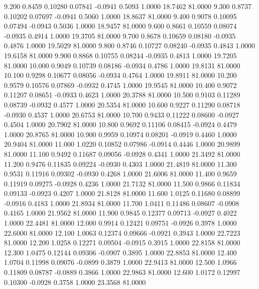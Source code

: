    9.200   0.8459   0.10280   0.07841  -0.0941   0.5093   1.0000  18.7462  81.0000
   9.300   0.8737   0.10202   0.07697  -0.0941   0.5060   1.0000  18.8637  81.0000
   9.400   0.9078   0.10095   0.07494  -0.0943   0.5036   1.0000  18.9457  81.0000
   9.600   0.8661   0.10559   0.08074  -0.0935   0.4914   1.0000  19.3705  81.0000
   9.700   0.8678   0.10659   0.08180  -0.0935   0.4876   1.0000  19.5029  81.0000
   9.800   0.8746   0.10727   0.08240  -0.0935   0.4843   1.0000  19.6158  81.0000
   9.900   0.8868   0.10755   0.08244  -0.0935   0.4813   1.0000  19.7205  81.0000
  10.000   0.9049   0.10739   0.08186  -0.0934   0.4786   1.0000  19.8131  81.0000
  10.100   0.9298   0.10677   0.08056  -0.0934   0.4764   1.0000  19.8911  81.0000
  10.200   0.9579   0.10576   0.07869  -0.0932   0.4745   1.0000  19.9545  81.0000
  10.400   0.9072   0.11207   0.08651  -0.0933   0.4623   1.0000  20.3788  81.0000
  10.500   0.9103   0.11289   0.08739  -0.0932   0.4577   1.0000  20.5354  81.0000
  10.600   0.9227   0.11290   0.08718  -0.0930   0.4537   1.0000  20.6753  81.0000
  10.700   0.9433   0.11222   0.08600  -0.0927   0.4504   1.0000  20.7902  81.0000
  10.800   0.9692   0.11106   0.08415  -0.0924   0.4479   1.0000  20.8765  81.0000
  10.900   0.9959   0.10974   0.08201  -0.0919   0.4460   1.0000  20.9404  81.0000
  11.000   1.0220   0.10852   0.07986  -0.0914   0.4446   1.0000  20.9899  81.0000
  11.100   0.9492   0.11687   0.09056  -0.0928   0.4341   1.0000  21.3492  81.0000
  11.200   0.9476   0.11835   0.09224  -0.0930   0.4303   1.0000  21.4819  81.0000
  11.300   0.9531   0.11916   0.09302  -0.0930   0.4268   1.0000  21.6006  81.0000
  11.400   0.9659   0.11919   0.09275  -0.0928   0.4236   1.0000  21.7132  81.0000
  11.500   0.9866   0.11834   0.09133  -0.0923   0.4207   1.0000  21.8128  81.0000
  11.600   1.0125   0.11680   0.08899  -0.0916   0.4183   1.0000  21.8934  81.0000
  11.700   1.0411   0.11486   0.08607  -0.0908   0.4165   1.0000  21.9562  81.0000
  11.900   0.9845   0.12377   0.09713  -0.0927   0.4022   1.0000  22.4481  81.0000
  12.000   0.9914   0.12421   0.09751  -0.0926   0.3978   1.0000  22.6000  81.0000
  12.100   1.0063   0.12374   0.09666  -0.0921   0.3943   1.0000  22.7223  81.0000
  12.200   1.0258   0.12271   0.09504  -0.0915   0.3915   1.0000  22.8158  81.0000
  12.300   1.0475   0.12144   0.09306  -0.0907   0.3895   1.0000  22.8853  81.0000
  12.400   1.0704   0.11998   0.09076  -0.0899   0.3879   1.0000  22.9413  81.0000
  12.500   1.0966   0.11809   0.08787  -0.0889   0.3866   1.0000  22.9863  81.0000
  12.600   1.0172   0.12997   0.10300  -0.0928   0.3758   1.0000  23.3568  81.0000
